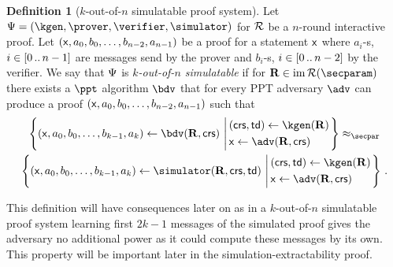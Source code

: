 \documentclass[runningheads,11pt]{llncs}
\theoremstyle{definition}
\newtheorem{definition}[theorem]{Definition}
\begin{document}
{\begin{definition}[$k$-out-of-$n$ simulatable proof system]
	Let $\proofsystem = (\kgen, \prover, \verifier, \simulator)$ for $\mathcal{R}$ be
  a $n$-round  interactive proof. Let $(\mathsf{x}, a_0, b_0, \ldots, b_{n - 2}, a_{n - 1})$ be a proof for a statement $\mathsf{x}$ where $a_i$-s, $i \in [0 \, .. \, n - 1]$ are messages send by the prover and $b_i$-s, $i \in [0 \, .. \, n - 2]$ by the verifier.
	We say that $\mathrm{\Psi}$ is \emph{$k$-out-of-$n$ simulatable} if for  $\REL \in \image{\RELGEN(\secparam)}$ there exists a $\ppt$ algorithm $\bdv$ that for every PPT adversary $\adv$ can produce a proof $(\mathsf{x}, a_0, b_0, \ldots, b_{n - 2}, a_{n - 1})$ such that
	\begin{multline*}
		\left\{(\inp, a_0, b_0, \ldots, b_{k - 1}, a_{k}) \gets \bdv(\REL ,\crs) \,\left\vert\,
		\begin{aligned}
			 & (\crs, \td) \gets \kgen(\REL) \\
			 & \inp \gets \adv(\REL, \crs)
		\end{aligned}
		\right.
		\right\} \approx_\secpar \\
		\left\{(\inp, a_0, b_0, \ldots, b_{k - 1}, a_{k}) \gets \simulator(\REL, \crs, \td) \,\left\vert\,
		\begin{aligned}
			 & (\crs, \td) \gets \kgen(\REL) \\
			 & \inp \gets \adv(\REL, \crs)
		\end{aligned}
		\right.
		\right\}\,.
	\end{multline*}
\end{definition}

This definition will have consequences later on as in a $k$-out-of-$n$ simulatable proof system learning first $2k - 1$ messages of the simulated proof gives the adversary no additional power as it could compute these messages by its own.
This property will be important later in the simulation-extractability proof.
}

\
\end{document}
